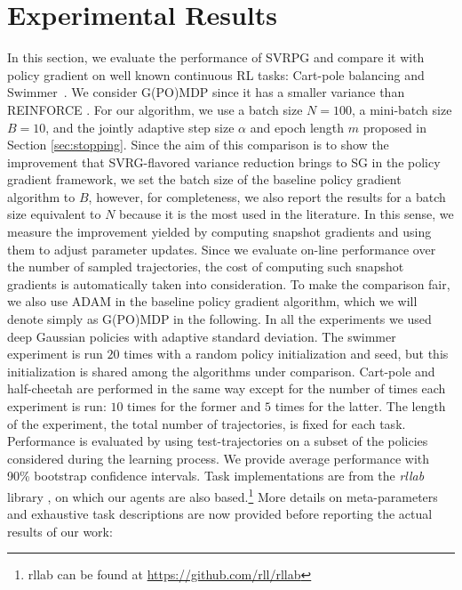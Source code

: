 \section{Experimental Results}\label{sec:exp}
\vspace{-0.05in}
In this section, we evaluate the performance of \acs{SVRPG} and compare it with policy gradient on well known continuous \acs{RL} tasks: Cart-pole balancing and Swimmer~\citep[\eg][]{duan2016benchmarking}.
We consider G(PO)MDP since it has a smaller variance than REINFORCE \citep{zhao2011analysis}.
For our algorithm, we use a batch size $N=100$, a mini-batch size $B=10$, and the jointly adaptive step size $\alpha$ and epoch length $m$ proposed in Section \ref{sec:stopping}. Since the aim of this comparison is to show the improvement that \acs{SVRG}-flavored variance reduction brings to \acs{SG} in the policy gradient framework, we set the batch size of the baseline policy gradient algorithm to $B$, however, for completeness, we also report the results for a batch size equivalent to $N$ because it is the most used in the literature. In this sense, we measure the improvement yielded by computing snapshot gradients and using them to adjust parameter updates. Since we evaluate on-line performance over the number of sampled trajectories, the cost of computing such snapshot gradients is automatically taken into consideration. To make the comparison fair, we also use \acs{ADAM} in the baseline policy gradient algorithm, which we will denote simply as G(PO)MDP in the following.
In all the experiments we used deep Gaussian policies with adaptive standard deviation.
The swimmer experiment is run $20$ times with a random policy initialization and seed, but this initialization is shared among the algorithms under comparison. Cart-pole and half-cheetah are performed in the same way except for the number of times each experiment is run: $10$ times for the former and $5$ times for the latter. The length of the experiment, \ie the total number of trajectories, is fixed for each task. Performance is evaluated by using test-trajectories on a subset of the policies considered during the learning process. We provide average performance with 90\% bootstrap confidence intervals.  
Task implementations are from the \textit{rllab} library \citep{duan2016benchmarking}, on which our agents are also based.\footnote{rllab can be found at \url{https://github.com/rll/rllab}}
More details on meta-parameters and exhaustive task descriptions are now provided before reporting the actual results of our work:
